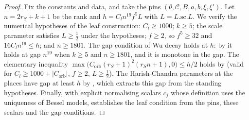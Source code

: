 \begin{proof}
Fix the constants and data, and take the pins $(\theta,\mathcal C,B,a,b,\xi,\xi')$. Let $n=2r_S+k+1$ be the rank and
$h=C_ln^{19}f^5L$ with $L=L.\mathrm{sc}.L$. We verify the numerical hypotheses of the leaf construction: $C_l\ge1000$; $k\ge5$;
the scale parameter satisfies $L\ge\frac12$ under the hypotheses; $f\ge2$, so $f^5\ge32$ and $16C_ln^{19}\le h$; and
$n\ge1801$. The gap condition of Wu decay holds at $h$: by  it holds at gap
$n^{19}$ when $k\ge5$ and $n\ge1801$, and it is monotone in the gap. The elementary inequality
$\max\bigl(C_{\mathrm{orb}}(r_S+1)^2(r_Sn+1),0\bigr)\le h/2$ holds by  (valid for
$C_l\ge1000+|C_{\mathrm{orb}}|$, $f\ge2$, $L\ge\frac12$). The Harish-Chandra parameters at the places have gap at least $h$ by
, which extracts this gap from the standing hypotheses. Finally, with
explicit normalising scalars $c_j$ whose definition uses the uniqueness of Bessel models,
 establishes the leaf condition from the pins, these scalars and the gap
conditions.
\end{proof}

